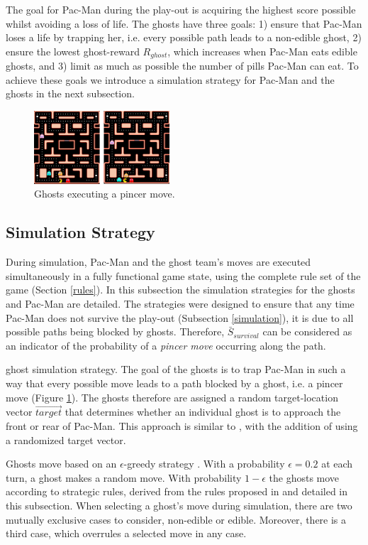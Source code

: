 \documentclass[journal]{IEEEtran}
\begin{document}
The goal for Pac-Man during the play-out is acquiring the highest score possible whilst avoiding a loss of life. The ghosts have three goals: 1) ensure that Pac-Man loses a life by trapping her, i.e. every possible path leads to a non-edible ghost, 2) ensure the lowest ghost-reward $R_{ghost}$, which increases when Pac-Man eats edible ghosts, and 3) limit as much as possible the number of pills Pac-Man can eat. To achieve these goals we introduce a simulation strategy for Pac-Man and the ghosts in the next subsection.
\begin{figure}[ht]
	\centering
	\includegraphics[width=0.45\textwidth]{figure4.png}
	\caption{Ghosts executing a pincer move.}
	\label{fig:pincer}
\end{figure}

\subsection{Simulation Strategy}
\label{simstrat}
During simulation, Pac-Man and the ghost team's moves are executed simultaneously in a fully functional game state, using the complete rule set of the game (Section \ref{rules}). In this subsection the simulation strategies for the ghosts and Pac-Man are detailed. The strategies were designed to ensure that any time Pac-Man does not survive the play-out (Subsection \ref{simulation}), it is due to all possible paths being blocked by ghosts. Therefore, $\bar{S}_{survival}$ can be considered as an indicator of the probability of a \emph{pincer move} occurring along the path.

{\sc ghost simulation strategy}.
The goal of the ghosts is to trap Pac-Man in such a way that every possible move leads to a path blocked by a ghost, i.e. a pincer move (Figure \ref{fig:pincer}). The ghosts therefore are assigned a random target-location vector $\vec{target}$ that determines whether an individual ghost is to approach the front or rear of Pac-Man. This approach is similar to \cite{ikehata2011monte}, with the addition of using a randomized target vector.

Ghosts move based on an $\epsilon$-greedy strategy \cite{sutton1998reinforcement, sturtevant2008analysis}. With a probability $\epsilon = 0.2$ at each turn, a ghost makes a random move. With probability $1-\epsilon$ the ghosts move according to strategic rules, derived from the rules proposed in \cite{ikehata2011monte} and detailed in this subsection.
When selecting a ghost's move during simulation, there are two mutually exclusive cases to consider, non-edible or edible. Moreover, there is a third case, which overrules a selected move in any case.
\end{document}
